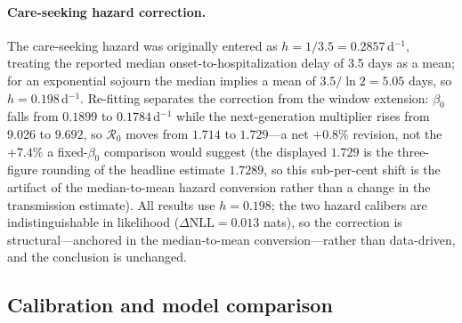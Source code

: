 \documentclass[10pt]{plos}
\newcommand{\Reff}{\mathcal{R}}
\begin{document}
\paragraph{Care-seeking hazard correction.}
The care-seeking hazard was originally entered as $h=1/3.5=0.2857\,$d$^{-1}$,
treating the reported median onset-to-hospitalization delay of 3.5 days
as a mean; for an exponential sojourn the median implies a mean of
$3.5/\ln 2=5.05$ days, so $h=0.198\,$d$^{-1}$. Re-fitting separates the
correction from the window extension: $\beta_0$ falls from $0.1899$ to
$0.1784\,$d$^{-1}$ while the next-generation multiplier rises from
$9.026$ to $9.692$, so $\Reff_0$ moves from $1.714$ to
$1.729$---a net $+0.8\%$ revision, not the $+7.4\%$ a fixed-$\beta_0$
comparison would suggest (the displayed $1.729$ is the three-figure
rounding of the headline estimate $1.7289$, so this sub-per-cent shift is
the artifact of the median-to-mean hazard conversion rather than a change
in the transmission estimate). All results use $h=0.198$; the two hazard
calibers are indistinguishable in likelihood ($\Delta\mathrm{NLL}=0.013$ nats), so the correction is structural---anchored in the median-to-mean conversion---rather than data-driven, and the conclusion is unchanged.
\subsection{Calibration and model comparison}\label{sec:estimation}
\end{document}
